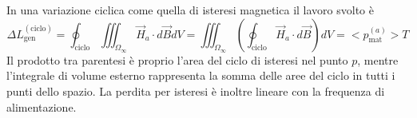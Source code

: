 In una variazione ciclica come quella di isteresi magnetica il lavoro svolto è
$$
\Delta L_{\text{gen}}^{(\text{ciclo})} = \oint_{\text{ciclo}} \iiint_{\Omega_\infty} \vec{H}_a\cdot d\vec{B} dV = \iiint_{\Omega_\infty} \left(\oint_{\text{ciclo}} \vec{H}_a \cdot d\vec{B}\right) dV = <p^{(a)}_{\text{mat}}> T 
$$
Il prodotto tra parentesi è proprio l'area del ciclo di isteresi nel punto $p$, mentre
l'integrale di volume esterno rappresenta la somma delle aree del ciclo in tutti i punti 
dello spazio. La perdita per isteresi è inoltre lineare con la frequenza di alimentazione.
